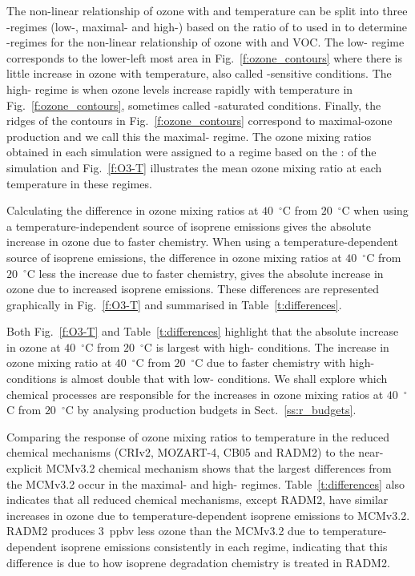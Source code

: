 The non-linear relationship of ozone with  and temperature can be split into three -regimes (low-, maximal- and high-) based on the ratio of  to  used in \citet{Sillman:1995} to determine -regimes for the non-linear relationship of ozone with  and VOC.
The low- regime corresponds to the lower-left most area in Fig.~\ref{f:ozone_contours} where there is little increase in ozone with temperature, also called -sensitive conditions.
The high- regime is when ozone levels increase rapidly with temperature in Fig.~\ref{f:ozone_contours}, sometimes called -saturated conditions.
Finally, the ridges of the contours in Fig.~\ref{f:ozone_contours} correspond to maximal-ozone production and we call this the maximal- regime.
The ozone mixing ratios obtained in each simulation were assigned to a  regime based on the : of the simulation and Fig.~\ref{f:O3-T} illustrates the mean ozone mixing ratio at each temperature in these  regimes.

Calculating the difference in ozone mixing ratios at $40$~$^{\circ}$C from $20$~$^{\circ}$C when using a temperature-independent source of isoprene emissions gives the absolute increase in ozone due to faster chemistry.
When using a temperature-dependent source of isoprene emissions, the difference in ozone mixing ratios at $40$~$^{\circ}$C from $20$~$^{\circ}$C less the increase due to faster chemistry, gives the absolute increase in ozone due to increased isoprene emissions.
These differences are represented graphically in Fig.~\ref{f:O3-T} and summarised in Table~\ref{t:differences}.

Both Fig.~\ref{f:O3-T} and Table~\ref{t:differences} highlight that the absolute increase in ozone at $40$~$^{\circ}$C from $20$~$^{\circ}$C is largest with high- conditions.
The increase in ozone mixing ratio at $40$~$^{\circ}$C from $20$~$^{\circ}$C due to faster chemistry with high- conditions is almost double that with low- conditions.
We shall explore which chemical processes are responsible for the increases in ozone mixing ratios at $40$~$^{\circ}$C from $20$~$^{\circ}$C by analysing  production budgets in Sect.~\ref{ss:r_budgets}.

Comparing the response of ozone mixing ratios to temperature in the reduced chemical mechanisms (CRIv2, MOZART-4, CB05 and RADM2) to the near-explicit MCMv3.2 chemical mechanism shows that the largest differences from the MCMv3.2 occur in the maximal- and high- regimes.
Table~\ref{t:differences} also indicates that all reduced chemical mechanisms, except RADM2, have similar increases in ozone due to temperature-dependent isoprene emissions to MCMv3.2.
RADM2 produces $3$~ppbv less ozone than the MCMv3.2 due to temperature-dependent isoprene emissions consistently in each  regime, indicating that this difference is due to how isoprene degradation chemistry is treated in RADM2.

